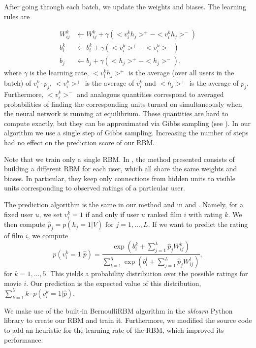 \documentclass[10pt,conference,compsocconf]{IEEEtran}
\begin{document}
After going through each batch, we update the weights and biases. The learning rules are

\begin{equation}
\begin{split}
W^k_{ij} &\leftarrow W^k_{ij} + \gamma(<v^k_ih_j>^+-<v^k_ih_j>^-)\\
b^k_i &\leftarrow b^k_i + \gamma(<v^k_i>^+-<v^k_i>^-)\\
b_j &\leftarrow b_j + \gamma(<h_j>^+-<h_j>^-),
\end{split}
\end{equation}
where $\gamma$ is the learning rate, $<v^k_ih_j>^+$ is the average (over all users in the batch) of $v^k_i\cdot p_j$, $<v^k_i>^+$ is the average of $v^k_i$ and $<h_j>^+$ is the average of $p_j$. Furthermore, $<v^k_i>^-$ and analogous quantities correspond to averaged probabilities of finding the corresponding units turned on simultaneously  when the neural network is running at equilibrium. These quantities are hard to compute exactly, but they can be approximated via Gibbs sampling (see \cite{H02}). In our algorithm we use a single step of Gibbs sampling. Increasing the number of steps had no effect on the prediction score of our RBM.

Note that we train only a single RBM. In \cite{SMH07}, the method presented consists of building a different RBM for each user, which all share the same weights and biases. In particular, they keep only connections from hidden units to visible units corresponding to observed ratings of a particular user.

The prediction algorithm is the same in our method and in \cite{SMH07} and \cite{L10}. Namely, for a fixed user $u$, we set $v^k_i=1$ if and only if user $u$ ranked film $i$ with rating $k$. We then compute $\hat{p}_j=p(h_j=1|V)$ for $j=1,\dots, L$. If we want to predict the rating of film $i$, we compute
\begin{equation}
	p(v^k_i=1|\hat{p})=\frac{\exp(b^k_i+\sum_{j=1}^L \hat{p}_jW^k_{ij})}{\sum_{l=1}^{5}\exp(b^l_i+\sum_{j=1}^{L}\hat{p}_jW^l_{ij})},
\end{equation}
for $k=1,\dots, 5$. This yields a probability distribution over the possible ratings for movie $i$. Our prediction is the expected value of this distribution, $\sum_{k=1}^{5}k\cdot p(v^k_i=1|\hat{p})$.

We make use of the built-in BernoulliRBM algorithm in the \textit{sklearn} Python library to create our RBM and train it. Furthermore, we modified the source code to add an heuristic for the learning rate of the RBM, which improved its performance.
\end{document}
